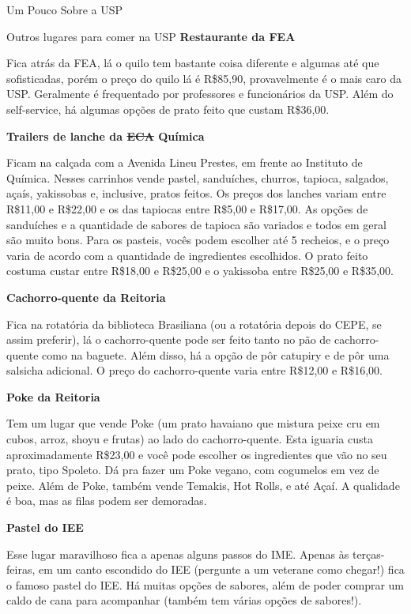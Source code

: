 \begin{secao}{Um Pouco Sobre a USP}
\begin{subsecao}{Outros lugares para comer na USP}
\textbf{Restaurante da FEA}

Fica atrás da FEA, lá o quilo tem bastante coisa diferente e algumas até que
sofisticadas, porém o preço do quilo lá é R\$85,90, provavelmente é o mais caro
da USP. Geralmente é frequentado por professores e funcionários da USP. Além do
self-service, há algumas opções de prato feito que custam R\$36,00.

\textbf{Trailers de lanche da \sout{ECA} Química}

Ficam na calçada com a Avenida Lineu Prestes, em frente ao Instituto de Química. 
Nesses carrinhos vende pastel, sanduíches, churros, tapioca, salgados, açaís, yakissobas e, 
inclusive, pratos feitos. Os preços dos lanches variam entre R\$11,00 e R\$22,00 e os das tapiocas 
entre R\$5,00 e R\$17,00. As opções de sanduíches e a quantidade de sabores de tapioca 
são variados e todos em geral são muito bons. Para os pasteis, vocês podem escolher até 5 recheios, 
e o preço varia de acordo com a quantidade de ingredientes escolhidos. O prato feito costuma custar 
entre R\$18,00 e R\$25,00 e o yakissoba entre R\$25,00 e R\$35,00.

\textbf{Cachorro-quente da Reitoria}

Fica na rotatória da biblioteca Brasiliana (ou a rotatória depois do CEPE, se assim preferir),
lá o cachorro-quente pode ser feito tanto no pão de cachorro-quente como na baguete. Além disso,
há a opção de pôr catupiry e de pôr uma salsicha adicional. O preço do cachorro-quente varia
entre R\$12,00 e R\$16,00.

\textbf{Poke da Reitoria}

Tem um lugar que vende Poke (um prato havaiano que mistura peixe cru em cubos,
arroz, shoyu e frutas) ao lado do cachorro-quente. Esta iguaria custa
aproximadamente R\$23,00 e você pode escolher os ingredientes que vão no seu prato,
tipo Spoleto. Dá pra fazer um Poke vegano, com cogumelos em vez de peixe. Além de
Poke, também vende Temakis, Hot Rolls, e até Açaí. A qualidade é boa, mas as filas
podem ser demoradas.

\textbf{Pastel do IEE}

Esse lugar maravilhoso fica a apenas alguns passos do IME. Apenas às terças-feiras,
em um canto escondido do IEE (pergunte a um veterane como chegar!) fica o famoso pastel do IEE.
Há muitas opções de sabores, além de poder comprar um caldo de cana para acompanhar (também tem 
várias opções de sabores!).



\pagebreak
\end{subsecao}

\end{secao}
